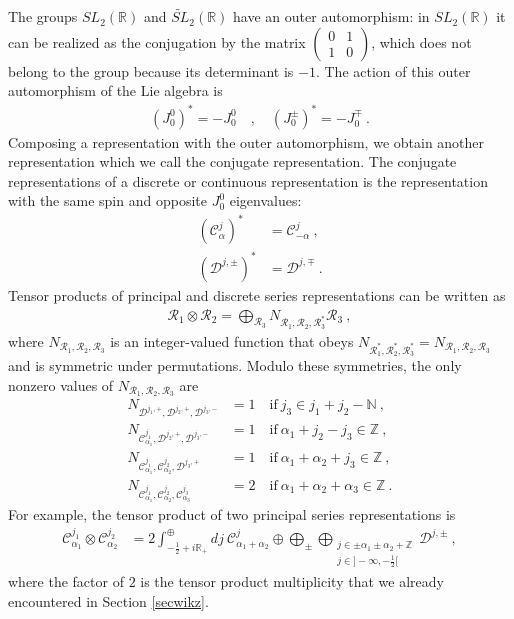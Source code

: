 \documentclass[12pt, a4paper, notitlepage, twoside]{report}
\numberwithin{equation}{section}
\theoremstyle{break}
\begin{document}
The groups $SL_2(\mathbb{R})$ and $\widetilde{SL}_2(\mathbb{R})$ have an outer automorphism: in $SL_2(\mathbb{R})$ it can be realized as the conjugation by the matrix $\left(\begin{smallmatrix} 0 & 1 \\ 1 & 0\end{smallmatrix}\right)$, which does not belong to the group because its determinant is $-1$. The action of this outer automorphism of the Lie algebra is 
\begin{align}
 (J_0^0)^* = -J_0^0 \quad , \quad (J_0^\pm)^* = - J_0^\mp\ .
\end{align}
Composing a representation with the outer automorphism, we obtain another representation which we call the conjugate representation. The conjugate representations of a discrete or continuous representation is the representation with the same spin and opposite $J_0^0$ eigenvalues:
\begin{align}
 (\mathcal{C}^j_\alpha)^* &= \mathcal{C}^j_{-\alpha} \ , 
\\
 (\mathcal{D}^{j,\pm})^* &= \mathcal{D}^{j,\mp}\ .
\end{align}
Tensor products of principal and discrete series representations can be written as 
\begin{align}
 \mathcal{R}_1\otimes \mathcal{R}_2 = \bigoplus_{\mathcal{R}_3} N_{\mathcal{R}_1,\mathcal{R}_2,\mathcal{R}_3^*} \mathcal{R}_3\ ,
\label{ror}
\end{align}
where $N_{\mathcal{R}_1,\mathcal{R}_2,\mathcal{R}_3}$ is an integer-valued function that obeys $N_{\mathcal{R}_1^*,\mathcal{R}_2^*,\mathcal{R}_3^*}=N_{\mathcal{R}_1,\mathcal{R}_2,\mathcal{R}_3}$ and is symmetric under permutations.
Modulo these symmetries, the only nonzero values of $N_{\mathcal{R}_1,\mathcal{R}_2,\mathcal{R}_3}$ are
\begin{align}
N_{\mathcal{D}^{j_1,+},\mathcal{D}^{j_2,+},\mathcal{D}^{j_3,-}} &= 1 \quad \text{if}\ j_3\in j_1+j_2-{\mathbb{N}}\ ,
\label{nddd}
\\
N_{\mathcal{C}^{j_1}_{\alpha_1},\mathcal{D}^{j_2,+},\mathcal{D}^{j_3,-}} &= 1 \quad \text{if}\ \alpha_1+j_2-j_3\in{\mathbb{Z}}\ ,
\\
 N_{\mathcal{C}^{j_1}_{\alpha_1},\mathcal{C}^{j_2}_{\alpha_2},\mathcal{D}^{j_3,+}} &= 1 \quad \text{if}\ \alpha_1+\alpha_2+j_3\in {\mathbb{Z}}\ ,
\\
N_{\mathcal{C}^{j_1}_{\alpha_1},\mathcal{C}^{j_2}_{\alpha_2},\mathcal{C}^{j_3}_{\alpha_3}} &= 2 \quad \text{if}\ \alpha_1+\alpha_2+\alpha_3\in {\mathbb{Z}}\ .
\end{align}
For example, the tensor product of two principal series representations is
\begin{align}
 \mathcal{C}^{j_1}_{\alpha_1}\otimes \mathcal{C}^{j_2}_{\alpha_2} &= 2\int^\oplus_{-\frac12+i{\mathbb{R}}_+} dj\ \mathcal{C}^j_{\alpha_1+\alpha_2} 
\oplus \bigoplus_\pm \bigoplus_{\substack{j\in \pm\alpha_1\pm\alpha_2+{\mathbb{Z}}\\ j\in]-\infty,-\frac12[}} \mathcal{D}^{j,\pm} \ ,
\label{coc}
\end{align}
where the factor of $2$ is the tensor product multiplicity that we already encountered in Section \ref{secwikz}.
\end{document}
